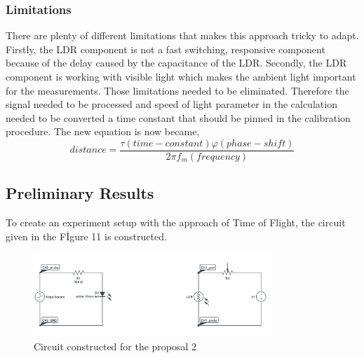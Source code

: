 \documentclass[letterpaper,12pt]{article}
\begin{document}
\subsubsection{Limitations}
There are plenty of different limitations that makes this approach tricky to adapt. Firstly, the LDR component is not a fast switching, responsive component because of the delay caused by the capacitance of the LDR. Secondly, the LDR component is working with visible light which makes the ambient light important for the measurements. Those limitations needed to be eliminated. Therefore the signal needed to be processed and speed of light parameter in the calculation needed to be converted a time constant that should be pinned in the calibration procedure. The new equation is now became,
\[distance = \frac{  \tau (time-constant)  \varphi (phase-shift)  }{2 \pi f_m (frequency)}\]

\subsection{Preliminary Results}
To create an experiment setup with the approach of Time of Flight, the circuit given in the Fİgure 11 is constructed.
\begin{figure}[H]
	\centering
   \includegraphics[width=0.8\textwidth]{circuit2.png}
   \caption{Circuit constructed for the proposal 2}
\end{figure} 
\end{document}
